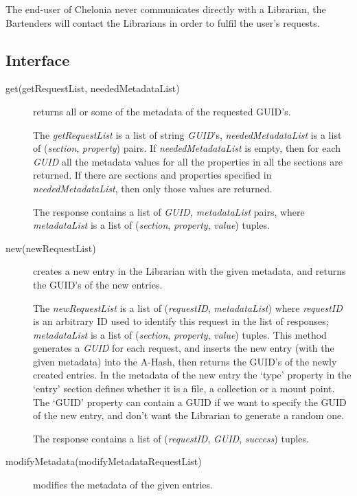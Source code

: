 \documentclass{book}
\begin{document}
The end-user of Chelonia never communicates directly with a Librarian, the Bartenders will contact the Librarians in order to fulfil the user's requests.


\subsection{Interface} %

\begin{description}

    \item [get(getRequestList, neededMetadataList)] returns all or some of the metadata of the requested GUID's.
    
    The \emph{getRequestList} is a list of string \emph{GUID}'s, \emph{neededMetadataList} is a list of (\emph{section}, \emph{property}) pairs. If \emph{neededMetadataList} is empty, then for each \emph{GUID} all the metadata values for all the properties in all the sections are returned. If there are sections and properties specified in \emph{neededMetadataList}, then only those values are returned.

    The response contains a list of \emph{GUID, metadataList} pairs, where \emph{metadataList} is a list of (\emph{section}, \emph{property}, \emph{value}) tuples.

    \item[new(newRequestList)] creates a new entry in the Librarian with the given metadata, and returns the GUID's of the new entries.
    
    The \emph{newRequestList} is a list of (\emph{requestID}, \emph{metadataList}) where \emph{requestID} is an arbitrary ID used to identify this request in the list of responses; \emph{metadataList} is a list of (\emph{section}, \emph{property}, \emph{value}) tuples.
    This method generates a \emph{GUID} for each request, and inserts the new entry (with the given metadata) into the A-Hash, then returns the GUID's of the newly created entries. In the metadata of the new entry the `type' property in the `entry' section defines whether it is a file, a collection or a mount point. The `GUID' property can contain a GUID if we want to specify the GUID of the new entry, and don't want the Librarian to generate a random one.
    
    The response contains a list of (\emph{requestID}, \emph{GUID}, \emph{success}) tuples.
    
    \item[modifyMetadata(modifyMetadataRequestList)] modifies the metadata of the given entries.
    

\end{description}
\end{document}
